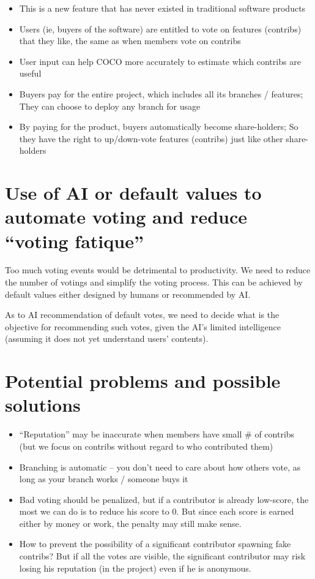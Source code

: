 \documentclass[12pt, orivec, fleqn]{article}
\begin{document}
\begin{itemize}
	\item This is a new feature that has never existed in traditional software products
	
	\item Users (ie, buyers of the software) are entitled to vote on features (contribs) that they like, the same as when members vote on contribs
	
	\item User input can help COCO more accurately to estimate which contribs are useful

	\item Buyers pay for the entire project, which includes all its branches / features;  They can choose to deploy any branch for usage

	\item By paying for the product, buyers automatically become share-holders;  So they have the right to up/down-vote features (contribs) just like other share-holders
\end{itemize}

\secttoc
\section{Use of AI or default values to automate voting and reduce ``voting fatique''}

Too much voting events would be detrimental to productivity.  We need to reduce the number of votings and simplify the voting process.  This can be achieved by default values either designed by humans or recommended by AI.

As to AI recommendation of default votes, we need to decide what is the objective for recommending such votes, given the AI's limited intelligence (assuming it does not yet understand users' contents).

\secttoc
\section{Potential problems and possible solutions}

\begin{itemize}
	\item ``Reputation'' may be inaccurate when members have small \# of contribs (but we focus on contribs without regard to who contributed them)
	
	\item Branching is automatic -- you don't need to care about how others vote, as long as your branch works / someone buys it
	
	\item Bad voting should be penalized, but if a contributor is already low-score, the most we can do is to reduce his score to 0.  But since each score is earned either by money or work, the penalty may still make sense.
	
	\item How to prevent the possibility of a significant contributor spawning fake contribs?  But if all the votes are visible, the significant contributor may risk losing his reputation (in the project) even if he is anonymous.
\end{itemize}
\end{document}
